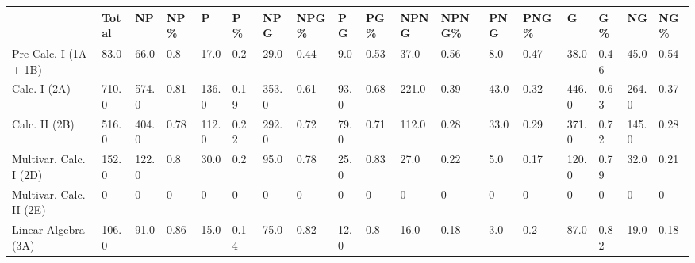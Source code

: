 \begin{table*}
\begin{tabular}{lp{.6cm}p{.6cm}p{.6cm}p{.6cm}p{.6cm}p{.6cm}p{.6cm}p{.6cm}p{.6cm}p{.6cm}p{.6cm}p{.6cm}p{.6cm}p{.6cm}p{.6cm}p{.6cm}p{.6cm}}
\toprule
                                    &  Total &     NP &   NP\% &      P &   P \% &    NPG &  NPG\% &    PG &   PG\% &   NPNG & NPNG\% &   PNG & PNG \% &      G &    G\% &     NG &   NG\% \\
\midrule
           Pre-Calc. I (1A + 1B) &   83.0 &   66.0 &   0.8 &   17.0 &   0.2 &   29.0 &  0.44 &   9.0 &  0.53 &   37.0 &  0.56 &   8.0 &  0.47 &   38.0 &  0.46 &   45.0 &  0.54 \\
                    Calc. I (2A) &  710.0 &  574.0 &  0.81 &  136.0 &  0.19 &  353.0 &  0.61 &  93.0 &  0.68 &  221.0 &  0.39 &  43.0 &  0.32 &  446.0 &  0.63 &  264.0 &  0.37 \\
                   Calc. II (2B) &  516.0 &  404.0 &  0.78 &  112.0 &  0.22 &  292.0 &  0.72 &  79.0 &  0.71 &  112.0 &  0.28 &  33.0 &  0.29 &  371.0 &  0.72 &  145.0 &  0.28 \\
      Multivar. Calc. I (2D) &  152.0 &  122.0 &   0.8 &   30.0 &   0.2 &   95.0 &  0.78 &  25.0 &  0.83 &   27.0 &  0.22 &   5.0 &  0.17 &  120.0 &  0.79 &   32.0 &  0.21 \\
     Multivar. Calc. II (2E) &      0 &      0 &     0 &      0 &     0 &      0 &     0 &     0 &     0 &      0 &     0 &     0 &     0 &      0 &     0 &      0 &     0 \\
Linear Algebra (3A) &  106.0 &   91.0 &  0.86 &   15.0 &  0.14 &   75.0 &  0.82 &  12.0 &   0.8 &   16.0 &  0.18 &   3.0 &   0.2 &   87.0 &  0.82 &   19.0 &  0.18 \\
\bottomrule
\end{tabular}
\end{table*}


